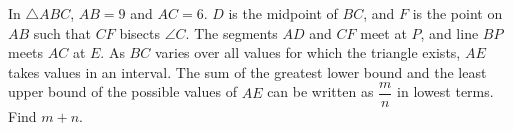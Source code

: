In $\triangle ABC$, $AB=9$ and $AC=6$. $D$ is the midpoint of $BC$, and $F$ is the point on $AB$ such that $CF$ bisects $\angle C$. The segments $AD$ and $CF$ meet at $P$, and line $BP$ meets $AC$ at $E$. As $BC$ varies over all values for which the triangle exists, $AE$ takes values in an interval. The sum of the greatest lower bound and the least upper bound of the possible values of $AE$ can be written as $\dfrac {m}{n}$ in lowest terms. Find $m+n$.
